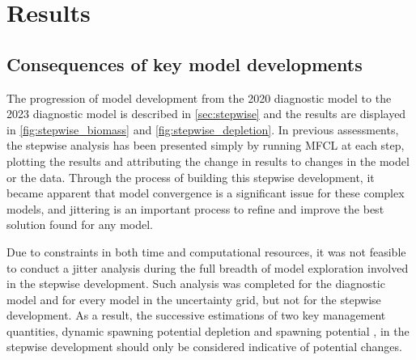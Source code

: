
\section{Results}

\subsection{Consequences of key model developments}
\label{sec:stepwise_results}

The progression of model development from the 2020 diagnostic model to the 2023 diagnostic model is described in \autoref{sec:stepwise} and the results are displayed in \autoref{fig:stepwise_biomass} and \autoref{fig:stepwise_depletion}. In previous assessments, the stepwise analysis has been presented simply by running MFCL at each step, plotting the results and attributing the change in results to changes in the model or the data. Through the process of building this stepwise development, it became apparent that model convergence is a significant issue for these complex models, and jittering is an important process to refine and improve the best solution found for any model.

Due to constraints in both time and computational resources, it was not feasible to conduct a jitter analysis during the full breadth of model exploration involved in the stepwise development. Such analysis was completed for the diagnostic model and for every model in the uncertainty grid, but not for the stepwise development. As a result, the successive estimations of two key management quantities, dynamic spawning potential depletion \sbsbfo and spawning potential \sb, in the stepwise development should only be considered indicative of potential changes.


